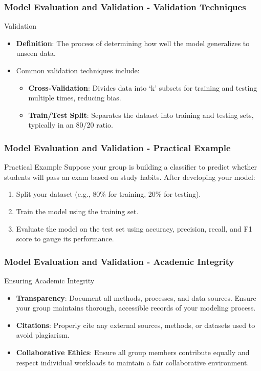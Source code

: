 \documentclass[aspectratio=169]{beamer}
\begin{document}
\begin{frame}[fragile]
    \frametitle{Model Evaluation and Validation - Validation Techniques}
    \begin{block}{Validation}
        \begin{itemize}
            \item \textbf{Definition}: The process of determining how well the model generalizes to unseen data.
            \item Common validation techniques include:
            \begin{itemize}
                \item \textbf{Cross-Validation}: Divides data into ‘k’ subsets for training and testing multiple times, reducing bias.
                \item \textbf{Train/Test Split}: Separates the dataset into training and testing sets, typically in an 80/20 ratio.
            \end{itemize}
        \end{itemize}
    \end{block}
\end{frame}

\begin{frame}[fragile]
    \frametitle{Model Evaluation and Validation - Practical Example}
    \begin{block}{Practical Example}
        Suppose your group is building a classifier to predict whether students will pass an exam based on study habits. After developing your model:
        \begin{enumerate}
            \item Split your dataset (e.g., 80\% for training, 20\% for testing).
            \item Train the model using the training set.
            \item Evaluate the model on the test set using accuracy, precision, recall, and F1 score to gauge its performance.
        \end{enumerate}
    \end{block}
\end{frame}

\begin{frame}[fragile]
    \frametitle{Model Evaluation and Validation - Academic Integrity}
    \begin{block}{Ensuring Academic Integrity}
        \begin{itemize}
            \item \textbf{Transparency}: Document all methods, processes, and data sources. Ensure your group maintains thorough, accessible records of your modeling process.
            \item \textbf{Citations}: Properly cite any external sources, methods, or datasets used to avoid plagiarism.
            \item \textbf{Collaborative Ethics}: Ensure all group members contribute equally and respect individual workloads to maintain a fair collaborative environment.
        \end{itemize}
    \end{block}
\end{frame}
\end{document}
